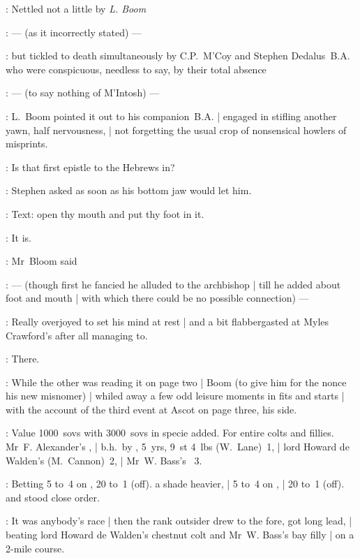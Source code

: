 :
Nettled not a little by \emph{L. Boom}

:
    --- (as it incorrectly stated) ---

:
but tickled to death simultaneously by C.P.~M'Coy and Stephen Dedalus~B.A.
who were conspicuous, needless to say, by their total absence

:
    --- (to say nothing of M'Intosh) ---

:
L.~Boom pointed it out to his companion~B.A. |
engaged in stifling another yawn, half nervousness, |
not forgetting the usual crop of nonsensical howlers of misprints.

\Stephen:
Is that first epistle to the Hebrews in?

:
Stephen asked as soon as his bottom jaw would let him.

\Stephen:
Text: open thy mouth and put thy foot in it.

\Bloom:
It is.

:
Mr~Bloom said

:
    --- (though first he fancied he alluded to the archbishop |
        till he added about foot and mouth |
        with which there could be no possible connection) ---

:
Really overjoyed to set his mind at rest |
and a bit flabbergasted at Myles Crawford's after all managing to.

\Bloom:
There.

:
While the other was reading it on page two |
Boom (to give him for the nonce his new misnomer) |
whiled away a few odd leisure moments in fits and starts |
with the account of the third event at Ascot on page three, his side.

:
Value 1000~sovs with 3000~sovs in specie added.
For entire colts and fillies.
Mr~F. Alexander's , |
b.h.~by , 5~yrs, 9~st 4~lbs (W.~Lane)~1, |
lord Howard de Walden's  (M.~Cannon)~2, |
Mr~W. Bass's ~3.

:
Betting 5 to~4 on , 20 to~1  (off).
 a shade heavier, |
5 to~4 on , |
20 to~1  (off).
 and  stood close order.

:
It was anybody's race |
then the rank outsider drew to the fore, got long lead, |
beating lord Howard de Walden's chestnut colt
and Mr~W. Bass's bay filly  |
on a 2-mile course.

